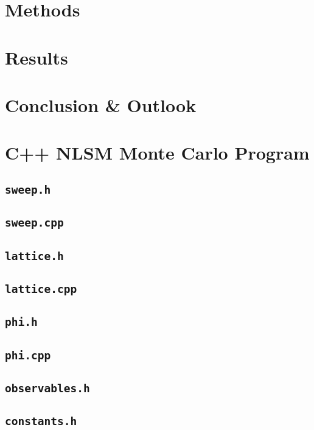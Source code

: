 \documentclass[12pt]{report}
\newcommand{\codeexample}[1]{
    \section{\texttt{#1}}
    
}
\begin{document}
\chapter{Methods}
\label{sec:methods}

\chapter{Results}

\chapter{Conclusion \& Outlook}

\appendix
\chapter{C++ NLSM Monte Carlo Program}

\codeexample{sweep.h}
\codeexample{sweep.cpp}
\codeexample{lattice.h}
\codeexample{lattice.cpp}
\codeexample{phi.h}
\codeexample{phi.cpp}
\codeexample{observables.h}
\codeexample{constants.h}

%
%

\printbibliography
\end{document}
